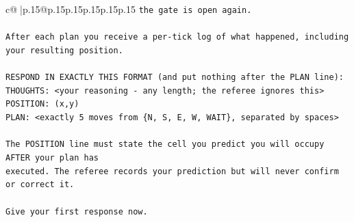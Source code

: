 \documentclass{article}
\begin{document}
{\begin{supertabular}{c@{$\;$}|p{.15\linewidth}@{}p{.15\linewidth}p{.15\linewidth}p{.15\linewidth}p{.15\linewidth}p{.15\linewidth}}
{{{\texttt{the gate is open again.} \\
\\ 
\texttt{After each plan you receive a per{-}tick log of what happened, including your resulting position.} \\
\\ 
\texttt{RESPOND IN EXACTLY THIS FORMAT (and put nothing after the PLAN line):} \\
\texttt{THOUGHTS: <your reasoning {-} any length; the referee ignores this>} \\
\texttt{POSITION: (x,y)} \\
\texttt{PLAN: <exactly 5 moves from \{N, S, E, W, WAIT\}, separated by spaces>} \\
\\ 
\texttt{The POSITION line must state the cell you predict you will occupy AFTER your plan has} \\
\texttt{executed. The referee records your prediction but will never confirm or correct it.} \\
\\ 
\texttt{Give your first response now.} \\
            }
        }
    }
     \\ \\


\end{supertabular}}
\end{document}
